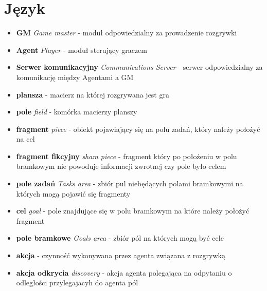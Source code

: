 \documentclass[Dokumentacja.tex]{subfiles}
\begin{document}
\section{Język}
\begin{itemize}
    \item \textbf{GM} \textit{Game master} - moduł odpowiedzialny za prowadzenie rozgrywki
    \item \textbf{Agent} \textit{Player} - moduł sterujący graczem
    \item \textbf{Serwer komunikacyjny} \textit{Communications Server} - serwer odpowiedzialny za komunikację między Agentami a GM
    \item \textbf{plansza} - macierz na której rozgrywana jest gra
    \item \textbf{pole} \textit{field} - komórka macierzy planszy
    \item \textbf{fragment} \textit{piece} - obiekt pojawiający się na polu zadań, który należy położyć na cel
    \item \textbf{fragment fikcyjny} \textit{sham piece} - fragment który po położeniu w polu bramkowym nie powoduje informacji zwrotnej czy pole było celem
    \item \textbf{pole zadań} \textit{Tasks area} - zbiór pul niebędących polami bramkowymi na których mogą pojawić się fragmenty
    \item \textbf{cel} \textit{goal} - pole znajdujące się w polu bramkowym na które należy położyć fragment
    \item \textbf{pole bramkowe} \textit{Goals area} - zbiór pól na których mogą być cele
    \item \textbf{akcja} - czynność wykonywana przez agenta związana z rozgrywką
    \item \textbf{akcja odkrycia} \textit{discovery} - akcja agenta polegająca na odpytaniu o odległości przylegajacyh do agenta pól
\end{itemize}
\end{document}
